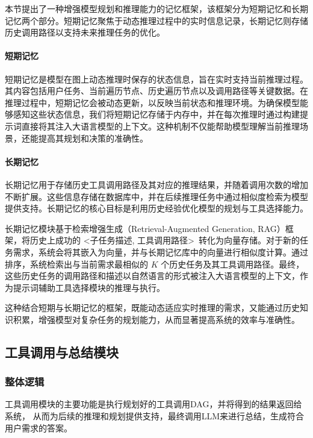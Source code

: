 本节提出了一种增强模型规划和推理能力的记忆框架，该框架分为短期记忆和长期记忆两个部分。短期记忆聚焦于动态推理过程中的实时信息记录，长期记忆则存储历史调用路径以支持未来推理任务的优化。

\paragraph{短期记忆}

短期记忆是模型在图上动态推理时保存的状态信息，旨在实时支持当前推理过程。其内容包括用户任务、当前遍历节点、历史遍历节点以及调用路径等关键数据。在推理过程中，短期记忆会被动态更新，以反映当前状态和推理环境。为确保模型能够感知这些状态信息，我们将短期记忆存储于内存中，并在每次推理时通过构建提示词直接将其注入大语言模型的上下文。这种机制不仅能帮助模型理解当前推理场景，还能提高其规划和决策的准确性。

\paragraph{长期记忆}

长期记忆用于存储历史工具调用路径及其对应的推理结果，并随着调用次数的增加不断扩展。这些信息存储在数据库中，并在后续推理任务中通过相似度检索为模型提供支持。长期记忆的核心目标是利用历史经验优化模型的规划与工具选择能力。

长期记忆模块基于检索增强生成（Retrieval-Augmented Generation, RAG）框架，将历史上成功的 \textless 子任务描述, 工具调用路径\textgreater\ 转化为向量存储。对于新的任务需求，系统会将其嵌入为向量，并与长期记忆库中的向量进行相似度计算。通过排序，系统检索出与当前需求最相似的 \(K\) 个历史任务及其工具调用路径。最终，这些历史任务的调用路径和描述以自然语言的形式被注入大语言模型的上下文，作为提示词辅助工具选择模块的推理与执行。

这种结合短期与长期记忆的框架，既能动态适应实时推理的需求，又能通过历史知识积累，增强模型对复杂任务的规划能力，从而显著提高系统的效率与准确性。

\subsection{工具调用与总结模块}
\label{sec:real_tool_simulation}

\subsubsection{整体逻辑}

工具调用模块的主要功能是执行规划好的工具调用DAG，并将得到的结果返回给系统，
从而为后续的推理和规划提供支持，最终调用LLM来进行总结，生成符合用户需求的答案。


